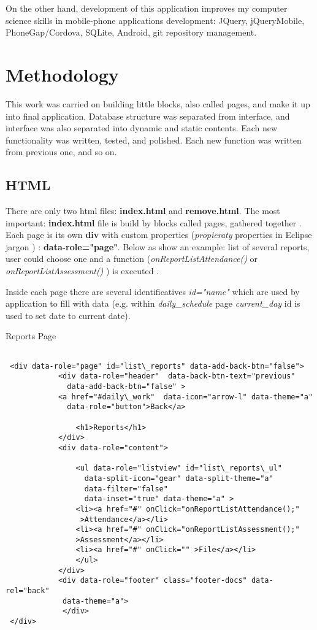 	On the other hand, development of this application improves my computer science skills in  mobile-phone applications development: JQuery,  jQueryMobile, PhoneGap/Cordova, SQLite, Android,  git repository management.

\section {Methodology}
	This work was carried on building little blocks, also called pages, and make it up into final application. Database structure was separated from interface, and interface was also separated into dynamic and static contents. Each new functionality was written, tested, and
	polished. Each new function was written from previous one, and so on.
	\subsection{HTML}
  There are only two html files: \textbf{index.html} and \textbf{remove.html}. The most important: \textbf{index.html} file is build by
   blocks called pages, gathered together \cite{JQueryMobilePage}. Each page is its own {\bf div } 
   with custom properties (\emph{propieraty} properties in Eclipse jargon ) : {\bf data-role="page"}. Below as show an example: list of several reports, user could choose one and a function (\emph{onReportListAttendance() } or \emph{onReportListAssessment() }  ) is executed .
   
   
  Inside each page there are several identificatives \emph{id="name"} which are used by application to fill with data (e.g.
   within \emph{daily\_schedule} page \emph{current\_day} id is used to set date to current date). 
  
\begin{bclogo}[couleur=blue!30,arrondi=0.1,ombre=true ] 
{Reports Page}
\begin{verbatim}
  
 <div data-role="page" id="list\_reports" data-add-back-btn="false">
            <div data-role="header"  data-back-btn-text="previous" 
              data-add-back-btn="false" >
            <a href="#daily\_work"  data-icon="arrow-l" data-theme="a" 
              data-role="button">Back</a>

                <h1>Reports</h1>
            </div>
            <div data-role="content">

                <ul data-role="listview" id="list\_reports\_ul" 
                  data-split-icon="gear" data-split-theme="a" 
                  data-filter="false" 
                  data-inset="true" data-theme="a" >
                <li><a href="#" onClick="onReportListAttendance();"
                 >Attendance</a></li>
                <li><a href="#" onClick="onReportListAssessment();" 
                >Assessment</a></li>
                <li><a href="#" onClick="" >File</a></li>
                </ul>
            </div>
            <div data-role="footer" class="footer-docs" data-rel="back"
             data-theme="a">
             </div>
 </div>
\end{verbatim}

\end{bclogo}

